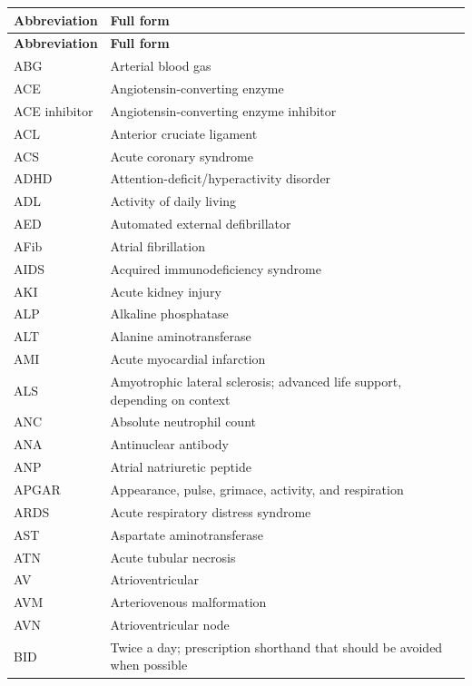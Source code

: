 \small
\setlength{\LTleft}{0pt}
\setlength{\LTright}{0pt}
\begin{longtable}{>{\raggedright\arraybackslash}p{} >{\raggedright\arraybackslash}p{}}
\toprule
\textbf{Abbreviation} & \textbf{Full form} \\
\midrule
\endfirsthead
\toprule
\textbf{Abbreviation} & \textbf{Full form} \\
\midrule
\endhead
\bottomrule
\endfoot

ABG & Arterial blood gas \\
ACE & Angiotensin-converting enzyme \\
ACE inhibitor & Angiotensin-converting enzyme inhibitor \\
ACL & Anterior cruciate ligament \\
ACS & Acute coronary syndrome \\
ADHD & Attention-deficit/hyperactivity disorder \\
ADL & Activity of daily living \\
AED & Automated external defibrillator \\
AFib & Atrial fibrillation \\
AIDS & Acquired immunodeficiency syndrome \\
AKI & Acute kidney injury \\
ALP & Alkaline phosphatase \\
ALT & Alanine aminotransferase \\
AMI & Acute myocardial infarction \\
ALS & Amyotrophic lateral sclerosis; advanced life support, depending on context \\
ANC & Absolute neutrophil count \\
ANA & Antinuclear antibody \\
ANP & Atrial natriuretic peptide \\
APGAR & Appearance, pulse, grimace, activity, and respiration \\
ARDS & Acute respiratory distress syndrome \\
AST & Aspartate aminotransferase \\
ATN & Acute tubular necrosis \\
AV & Atrioventricular \\
AVM & Arteriovenous malformation \\
AVN & Atrioventricular node \\
BID & Twice a day; prescription shorthand that should be avoided when possible \\

\end{longtable}
